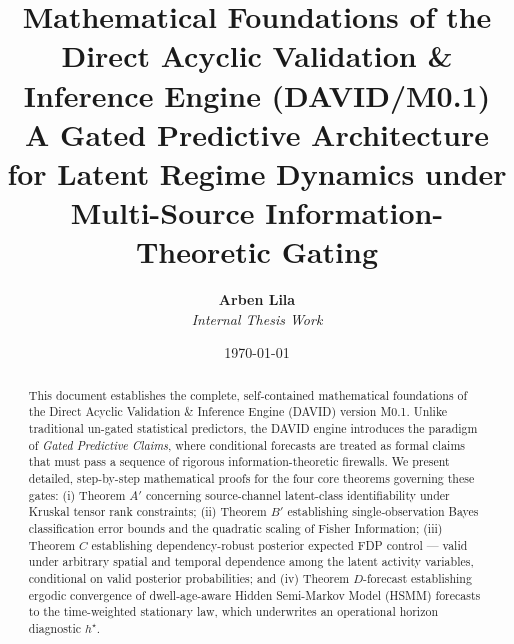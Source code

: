 \documentclass[11pt,a4paper]{article}
\title{\textbf{Mathematical Foundations of the Direct Acyclic Validation \& Inference Engine (DAVID/M0.1)}\\
\large A Gated Predictive Architecture for Latent Regime Dynamics under Multi-Source Information-Theoretic Gating}
\author{\textbf{Arben Lila} \\ \textit{Internal Thesis Work}}
\date{\today}
\begin{document}
\maketitle

\begin{abstract}
This document establishes the complete, self-contained mathematical foundations of the Direct Acyclic Validation \& Inference Engine (DAVID) version M0.1. Unlike traditional un-gated statistical predictors, the DAVID engine introduces the paradigm of \textit{Gated Predictive Claims}, where conditional forecasts are treated as formal claims that must pass a sequence of rigorous information-theoretic firewalls. We present detailed, step-by-step mathematical proofs for the four core theorems governing these gates: (i) Theorem $A'$ concerning source-channel latent-class identifiability under Kruskal tensor rank constraints; (ii) Theorem $B'$ establishing single-observation Bayes classification error bounds and the quadratic scaling of Fisher Information; (iii) Theorem $C$ establishing dependency-robust posterior expected FDP control --- valid under arbitrary spatial and temporal dependence among the latent activity variables, conditional on valid posterior probabilities; and (iv) Theorem $D$-forecast establishing ergodic convergence of dwell-age-aware Hidden Semi-Markov Model (HSMM) forecasts to the time-weighted stationary law, which underwrites an operational horizon diagnostic $h^\star$. %
\end{abstract}

\tableofcontents
\newpage
\end{document}
